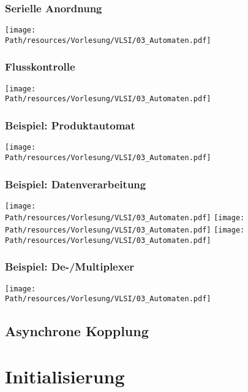 	\subsubsection{Serielle Anordnung}
		\begin{center}
			\texttt{[image: \\Path/resources/Vorlesung/VLSI/03\_Automaten.pdf]}
		\end{center}
		
	\subsubsection{Flusskontrolle}
		\begin{center}
			\texttt{[image: \\Path/resources/Vorlesung/VLSI/03\_Automaten.pdf]}
		\end{center}
		
	\subsubsection{Beispiel: Produktautomat}
		\begin{center}
			\texttt{[image: \\Path/resources/Vorlesung/VLSI/03\_Automaten.pdf]}
		\end{center}
		
	\subsubsection{Beispiel: Datenverarbeitung}
		\begin{center}
			\texttt{[image: \\Path/resources/Vorlesung/VLSI/03\_Automaten.pdf]}
			\texttt{[image: \\Path/resources/Vorlesung/VLSI/03\_Automaten.pdf]}
			\texttt{[image: \\Path/resources/Vorlesung/VLSI/03\_Automaten.pdf]}
		\end{center}
		
	\subsubsection{Beispiel: De-/Multiplexer}
		\begin{center}
			\texttt{[image: \\Path/resources/Vorlesung/VLSI/03\_Automaten.pdf]}
		\end{center}

\subsection{Asynchrone Kopplung}
\section{Initialisierung}
